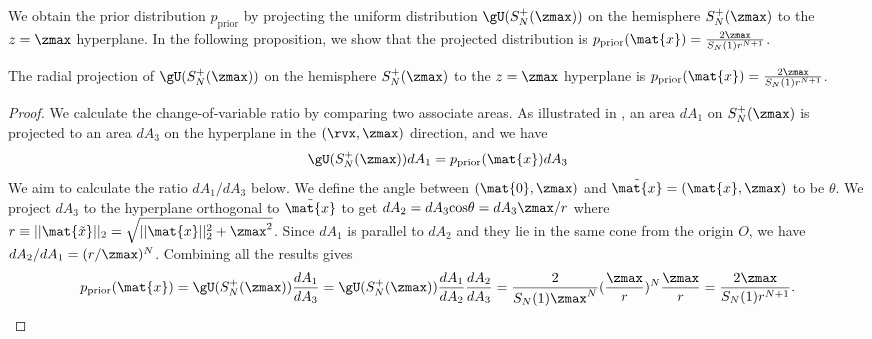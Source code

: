 We obtain the prior distribution $p_{\textrm{prior}}$ by projecting the uniform distribution $\gU(S_N^+(\zmax))$ on the hemisphere $S_N^+(\zmax)$ to the $z=\zmax$ hyperplane. In the following proposition, we show that the projected distribution is $p_{\textrm{prior}}(\mat{x})=\frac{2\zmax}{S_N(1)r^{N+1}}$. 
\begin{proposition}
\label{prop:prior}
The radial projection of $\gU(S_N^+(\zmax))$ on the hemisphere $S_N^+(\zmax)$ to the $z=\zmax$ hyperplane is $p_{\textrm{prior}}(\mat{x})=\frac{2\zmax}{S_N(1)r^{N+1}}$.
\end{proposition}
\begin{proof}
We calculate the change-of-variable ratio by comparing two associate areas. As illustrated in , an area $dA_1$ on $S_N^+(\zmax)$ is projected to an area $dA_3$ on the hyperplane in the $(\rvx,\zmax)$ direction, and we have $$\gU(S_N^+(\zmax))dA_1=p_{\textrm{prior}}(\mat{x})dA_3$$ We aim to calculate the ratio $dA_1/dA_3$ below. We define the angle between $(\mat{0}, \zmax)$ and $\tilde{\mat{x}}=(\mat{x},\zmax)$ to be $\theta$. We project $dA_3$ to the hyperplane orthogonal to $\tilde{\mat{x}}$ to get $dA_2=dA_3{\rm cos}\theta=dA_3\zmax/r$ where $r\equiv ||\mat{\tilde{x}}||_2=\sqrt{||\mat{x}||_2^2+\zmax^2}$. Since $dA_1$ is parallel to $dA_2$ and they lie in the same cone from the origin $O$, we have $dA_2/dA_1=(r/\zmax)^N$. Combining all the results gives
\begin{align*}
    p_{\textrm{prior}}(\mat{x})=\gU(S_N^+(\zmax))\frac{dA_1}{dA_3} = \gU(S_N^+(\zmax))\frac{dA_1}{dA_2}\frac{dA_2}{dA_3}=\frac{2}{S_N(1)\zmax^N}(\frac{\zmax}{r})^N\frac{\zmax}{r}=\frac{2\zmax}{S_N(1)r^{N+1}}.
\end{align*}
\end{proof}

